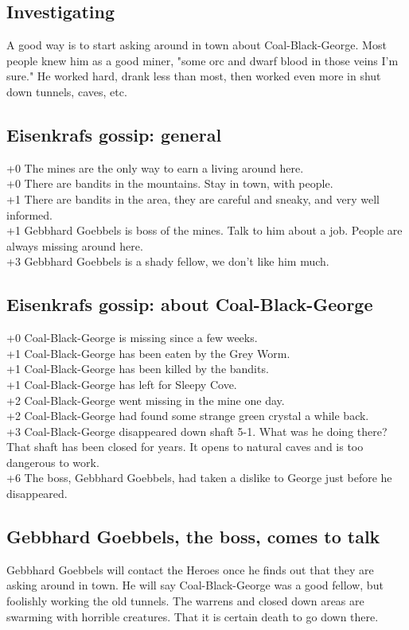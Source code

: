 \subsection*{Investigating}
A good way is to start asking around in town about Coal-Black-George. Most people knew him as a good miner, "some orc and dwarf blood in those veins I'm sure." He worked hard, drank less than most, then worked even more in shut down tunnels, caves, etc.


\subsection*{Eisenkrafs gossip: general}
+0 The mines are the only way to earn a living around here. \\
+0 There are bandits in the mountains. Stay in town, with people. \\
+1 There are bandits in the area, they are careful and sneaky, and very well informed. \\
+1 Gebbhard Goebbels is boss of the mines. Talk to him about a job. People are always missing around here. \\
+3 Gebbhard Goebbels is a shady fellow, we don't like him much.


\subsection*{Eisenkrafs gossip: about Coal-Black-George}
+0 Coal-Black-George is missing since a few weeks. \\
+1 Coal-Black-George has been eaten by the Grey Worm. \\
+1 Coal-Black-George has been killed by the bandits. \\
+1 Coal-Black-George has left for Sleepy Cove. \\
+2 Coal-Black-George went missing in the mine one day. \\
+2 Coal-Black-George had found some strange green crystal a while back. \\
+3 Coal-Black-George disappeared down shaft 5-1. What was he doing there? That shaft has been closed for years. It opens to natural caves and is too dangerous to work. \\
+6 The boss, Gebbhard Goebbels, had taken a dislike to George just before he disappeared.


\subsection*{Gebbhard Goebbels, the boss, comes to talk}
Gebbhard Goebbels will contact the Heroes once he finds out that they are asking around in town. He will say Coal-Black-George was a good fellow, but foolishly working the old tunnels. The warrens and closed down areas are swarming with horrible creatures. That it is certain death to go down there.

